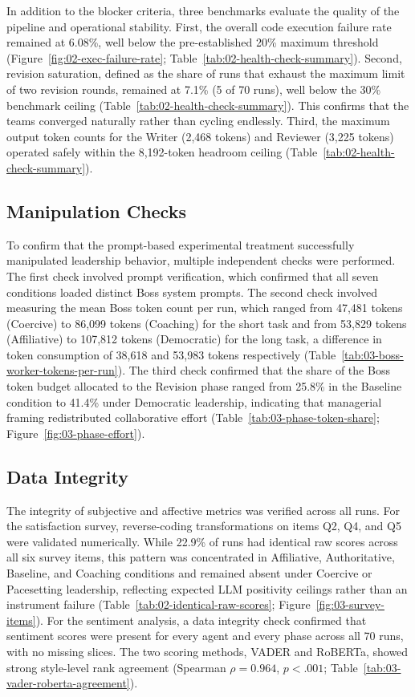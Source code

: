 In addition to the blocker criteria, three benchmarks evaluate the quality of the pipeline and operational stability. 
First, the overall code execution failure rate remained at 6.08\%, well below the pre-established 20\% maximum threshold (Figure~\ref{fig:02-exec-failure-rate}; Table~\ref{tab:02-health-check-summary}).
Second, revision saturation, defined as the share of runs that exhaust the maximum limit of two revision rounds, remained at 7.1\% (5 of 70 runs), well below the 30\% benchmark ceiling (Table~\ref{tab:02-health-check-summary}).
This confirms that the teams converged naturally rather than cycling endlessly.
Third, the maximum output token counts for the Writer (2,468 tokens) and Reviewer (3,225 tokens) operated safely within the 8,192-token headroom ceiling (Table~\ref{tab:02-health-check-summary}).

\subsection{Manipulation Checks}
\label{subsec:manipulation-checks}

To confirm that the prompt-based experimental treatment successfully manipulated leadership behavior, multiple independent checks were performed.
The first check involved prompt verification, which confirmed that all seven conditions loaded distinct Boss system prompts.
The second check involved measuring the mean Boss token count per run, which ranged from 47,481 tokens (Coercive) to 86,099 tokens (Coaching) for the short task and from 53,829 tokens (Affiliative) to 107,812 tokens (Democratic) for the long task, 
a difference in token consumption of 38,618 and 53,983 tokens respectively (Table~\ref{tab:03-boss-worker-tokens-per-run}).
The third check confirmed that the share of the Boss token budget allocated to the Revision phase ranged from 25.8\% in the Baseline condition to 41.4\% under Democratic leadership, indicating that managerial framing redistributed collaborative effort (Table~\ref{tab:03-phase-token-share}; Figure~\ref{fig:03-phase-effort}).

\subsection{Data Integrity}
\label{subsec:data-integrity}

The integrity of subjective and affective metrics was verified across all runs.
For the satisfaction survey, reverse-coding transformations on items Q2, Q4, and Q5 were validated numerically.
While 22.9\% of runs had identical raw scores across all six survey items, this pattern was concentrated in Affiliative, Authoritative, Baseline, and Coaching conditions and remained absent under Coercive or Pacesetting leadership, reflecting expected \ac{LLM} positivity ceilings rather than an instrument failure (Table~\ref{tab:02-identical-raw-scores}; Figure~\ref{fig:03-survey-items}).
For the sentiment analysis, a data integrity check confirmed that sentiment scores were present for every agent and every phase across all 70 runs, with no missing slices.
The two scoring methods, \ac{VADER} and \ac{RoBERTa}, showed strong style-level rank agreement (Spearman $\rho = 0.964$, $p < .001$; Table~\ref{tab:03-vader-roberta-agreement}).

